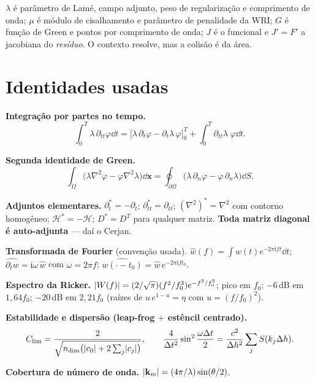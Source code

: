 \documentclass[11pt,a4paper,oneside]{report}
\begin{document}
\begin{atencao}
$\lambda$ \'e par\^ametro de Lam\'e, campo adjunto, peso de regulariza\c{c}\~ao
e comprimento de onda; $\mu$ \'e m\'odulo de cisalhamento e par\^ametro de
penalidade da WRI; $G$ \'e fun\c{c}\~ao de Green e pontos por comprimento de
onda; $J$ \'e o funcional e $J' = F'$ a jacobiana do \emph{res\'iduo}. O
contexto resolve, mas a colis\~ao \'e da \'area.
\end{atencao}

\chapter{Identidades usadas}

\textbf{Integra\c{c}\~ao por partes no tempo.}
\[
\int_0^T \lambda\,\partial_{tt}\varphi \dd t
 = \bigl[\lambda\,\partial_t\varphi - \partial_t\lambda\,\varphi\bigr]_0^T
 + \int_0^T \partial_{tt}\lambda\;\varphi \dd t .
\]

\textbf{Segunda identidade de Green.}
\[
\int_\Omega \bigl(\lambda\nabla^{2}\varphi - \varphi\nabla^{2}\lambda\bigr)
 \dd\mathbf{x}
 = \oint_{\partial\Omega}\bigl(\lambda\,\partial_n\varphi
 - \varphi\,\partial_n\lambda\bigr)\dd S .
\]

\textbf{Adjuntos elementares.}
$\partial_t^{*} = -\partial_t$; $\partial_{tt}^{*} = \partial_{tt}$;
$(\nabla^{2})^{*} = \nabla^{2}$ com contorno homog\^eneo;
$\mathcal{H}^{*} = -\mathcal{H}$; $D^{*} = D^{T}$ para qualquer matriz.
\textbf{Toda matriz diagonal \'e auto-adjunta} --- da\'i o Cerjan.

\textbf{Transformada de Fourier} (conven\c{c}\~ao usada).
$\hat w(f) = \int w(t)e^{-2\pi\mathrm{i}ft}\dd t$;
$\widehat{\partial_t w} = \mathrm{i}\omega\,\hat w$ com $\omega = 2\pi f$;
$\widehat{w(\cdot-t_0)} = \hat w\,e^{-2\pi\mathrm{i}ft_0}$.

\textbf{Espectro da Ricker.}
$\lvert W(f) \rvert = (2/\sqrt{\pi})(f^{2}/f_0^{3})e^{-f^{2}/f_0^{2}}$; pico em $f_0$;
$-6$\,dB em $1{,}64f_0$; $-20$\,dB em $2{,}21f_0$ (ra\'izes de
$u\,e^{1-u} = \eta$ com $u = (f/f_0)^{2}$).

\textbf{Estabilidade e dispers\~ao (leap-frog $+$ est\^encil centrado).}
\[
C_{\lim} = \frac{2}{\sqrt{n_{\dim}\bigl(\lvert c_0 \rvert+2\sum_j\lvert c_j \rvert\bigr)}},
\qquad
\frac{4}{\Delta t^{2}}\sin^{2}\frac{\omega\Delta t}{2}
 = \frac{c^{2}}{\Delta h^{2}}\sum_j S(k_j\Delta h).
\]

\textbf{Cobertura de n\'umero de onda.}
$\lvert \mathbf{k}_m \rvert = (4\pi/\lambda)\sin(\theta/2)$.
\end{document}
